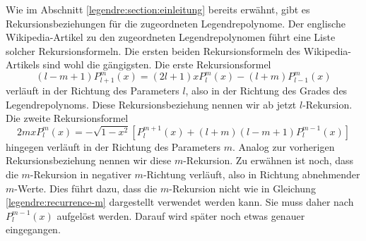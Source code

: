 Wie im Abschnitt \ref{legendre:section:einleitung} bereits erwähnt, gibt es Rekursionsbeziehungen für die zugeordneten Legendrepolynome.
Der englische Wikipedia-Artikel \cite{legendre:wikipedia} zu den zugeordneten Legendrepolynomen führt eine Liste solcher Rekursionsformeln.
Die ersten beiden Rekursionsformeln des Wikipedia-Artikels sind wohl die gängigsten.
Die erste Rekursionsformel
\begin{equation}
(l-m+1)P^{m}_{l+1}(x)
=(2l+1)xP^{m}_{l}(x)
-(l+m)P^{m}_{l-1}(x)
\label{legendre:recurrence-l}
\end{equation}
verläuft in der Richtung des Parameters $l$, also in der Richtung des Grades des Legendrepolynoms.
Diese Rekursionsbeziehung nennen wir ab jetzt $l$-Rekursion.
Die zweite Rekursionsformel
\begin{equation}
2mxP^{m}_{l}(x)
=-\sqrt{1-x^2}
\left[ P^{m+1}_{l}(x) + (l+m)(l-m+1)P^{m-1}_{l}(x) \right]
\label{legendre:recurrence-m}
\end{equation}
hingegen verläuft in der Richtung des Parameters $m$.
Analog zur vorherigen Rekursionsbeziehung nennen wir diese $m$-Rekursion.
Zu erwähnen ist noch, dass die $m$-Rekursion in negativer $m$-Richtung verläuft, also in Richtung abnehmender $m$-Werte.
Dies führt dazu, dass die $m$-Rekursion nicht wie in Gleichung \eqref{legendre:recurrence-m} dargestellt verwendet werden kann.
Sie muss daher nach $P^{m-1}_{l}(x)$ aufgelöst werden.
Darauf wird später noch etwas genauer eingegangen.

